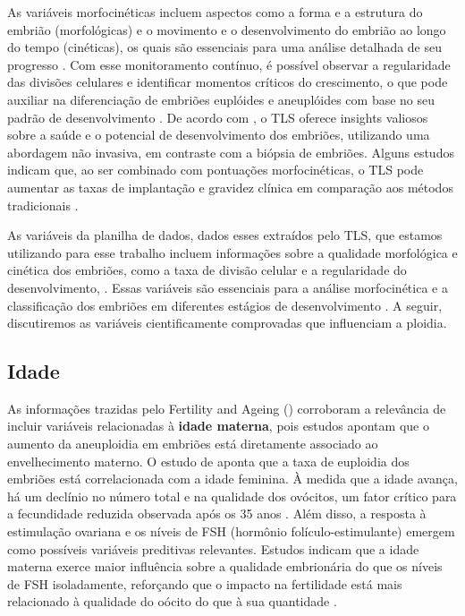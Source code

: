 As variáveis morfocinéticas incluem aspectos como a forma e a estrutura do embrião (morfológicas) e o movimento e o desenvolvimento do embrião ao longo do tempo (cinéticas), os quais são essenciais para uma análise detalhada de seu progresso \cite{gleicher2021}. Com esse monitoramento contínuo, é possível observar a regularidade das divisões celulares e identificar momentos críticos do crescimento, o que pode auxiliar na diferenciação de embriões euplóides e aneuplóides com base no seu padrão de desenvolvimento \cite{boucret2021}. De acordo com , o TLS oferece insights valiosos sobre a saúde e o potencial de desenvolvimento dos embriões, utilizando uma abordagem não invasiva, em contraste com a biópsia de embriões. Alguns estudos indicam que, ao ser combinado com pontuações morfocinéticas, o TLS pode aumentar as taxas de implantação e gravidez clínica em comparação aos métodos tradicionais \cite{boucret2021}.

As variáveis da planilha de dados, dados esses extraídos pelo TLS, que estamos utilizando para esse trabalho incluem informações sobre a qualidade morfológica e cinética dos embriões, como a taxa de divisão celular e a regularidade do desenvolvimento, . Essas variáveis são essenciais para a análise morfocinética e a classificação dos embriões em diferentes estágios de desenvolvimento \cite{boucret2021}. A seguir, discutiremos as variáveis cientificamente comprovadas que influenciam a ploidia.

\subsection{Idade}

As informações trazidas pelo Fertility and Ageing () corroboram a relevância de incluir variáveis relacionadas à \textbf{idade materna}, pois estudos apontam que o aumento da aneuploidia em embriões está diretamente associado ao envelhecimento materno. O estudo de  aponta que a taxa de euploidia dos embriões está correlacionada com a idade feminina. À medida que a idade avança, há um declínio no número total e na qualidade dos ovócitos, um fator crítico para a fecundidade reduzida observada após os 35 anos \cite{yuan2023}. Além disso, a resposta à estimulação ovariana e os níveis de FSH (hormônio folículo-estimulante) emergem como possíveis variáveis preditivas relevantes. Estudos indicam que a idade materna exerce maior influência sobre a qualidade embrionária do que os níveis de FSH isoladamente, reforçando que o impacto na fertilidade está mais relacionado à qualidade do oócito do que à sua quantidade \cite{eshre2005}.

